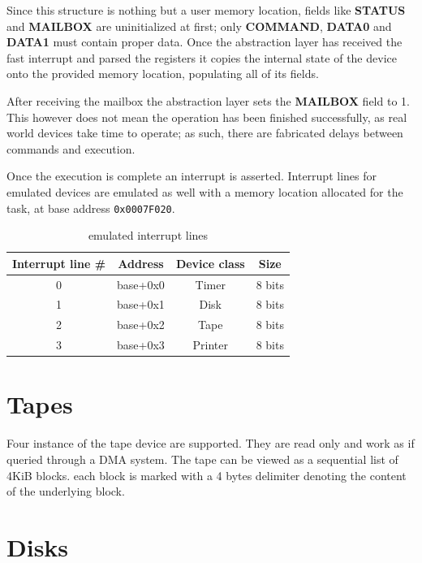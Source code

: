 \documentclass[12pt,a4paper,openright,twoside]{report}
\begin{document}
Since this structure is nothing but a user memory location, fields like \textbf{STATUS}
and \textbf{MAILBOX} are uninitialized at first; only \textbf{COMMAND}, \textbf{DATA0} and \textbf{DATA1}
must contain proper data. Once the abstraction layer has received the fast interrupt
and parsed the registers it copies the internal state of the device onto the
provided memory location, populating all of its fields.

After receiving the mailbox the abstraction layer sets the \textbf{MAILBOX} field
to 1. This however does not mean the operation has been finished successfully, as 
real world devices take time to operate; as such, there are fabricated delays between
commands and execution.

Once the execution is complete an interrupt is asserted. Interrupt lines for emulated
devices are emulated as well with a memory location allocated for the task, at 
base address {\tt 0x0007F020}.

\begin{table}[h]
\begin{center}
    \begin{tabular}{|c|c|c|c|}
    \hline
    \rowcolor[HTML]{C0C0C0} 
    Interrupt line \# & Address  & Device class & Size   \\ \hline
    0                 & base+0x0 & Timer        & 8 bits \\ \hline
    1                 & base+0x1 & Disk         & 8 bits \\ \hline
    2                 & base+0x2 & Tape         & 8 bits \\ \hline
    3                 & base+0x3 & Printer      & 8 bits \\ \hline
    \end{tabular}
 \caption[Table 2]{emulated interrupt lines}\label{tab:reg}
\end{center}
\end{table}

\section{Tapes}
Four instance of the tape device are supported. They are read only and work as if 
queried through a DMA system.
The tape can be viewed as a sequential list of 4KiB blocks. each block is marked 
with a 4 bytes delimiter denoting the content of the underlying block.


\section{Disks}
\end{document}
